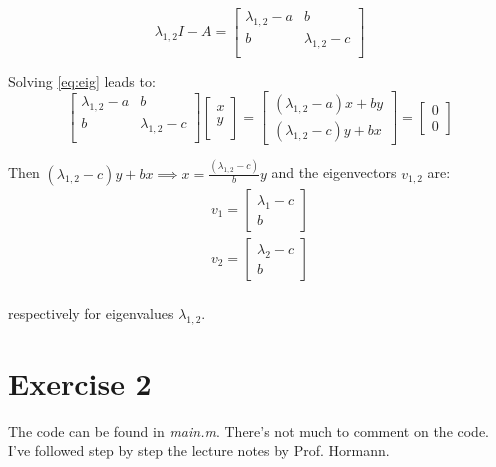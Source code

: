 \documentclass[12pt]{article}
\begin{document}
$$\lambda_{1,2} I - A = 
\begin{bmatrix}
	\lambda_{1,2} -a & b \\
	b & \lambda_{1,2} - c \\
\end{bmatrix}
$$

Solving \ref{eq:eig} leads to: \\

$$ 
\begin{bmatrix}
	\lambda_{1,2} - a & b \\
	b & \lambda_{1,2} - c\\
\end{bmatrix}
\begin{bmatrix}
	x \\
	y \\ 
\end{bmatrix}
= 
\begin{bmatrix}
(\lambda_{1,2} - a) x + b y \\
(\lambda_{1,2} - c) y + b x
\end{bmatrix}
=
\begin{bmatrix}
	0 \\ 0
\end{bmatrix}
$$

Then $(\lambda_{1,2} - c) y + b x \implies x = \frac{(\lambda_{1,2} - c)}{b} y$ and the eigenvectors $v_{1,2}$ are: \\

\begin{align*}
	v_1 = \begin{bmatrix}
		\lambda_{1} - c \\ b
	\end{bmatrix}	 \\
	v_2 = \begin{bmatrix}
		\lambda_{2} - c \\ b
	\end{bmatrix}	 \\
\end{align*}

respectively for eigenvalues $\lambda_{1,2}$. \\

\section*{Exercise 2}

The code can be found in \textit{main.m}. There's not much to comment on the code. I've followed step by step the lecture notes by Prof. Hormann. \\ 
\end{document}
